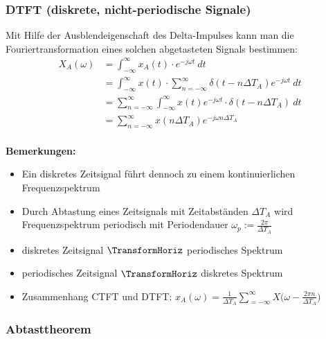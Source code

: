 \documentclass[12pt,a4paper]{scrartcl}
\begin{document}
\subsubsection{DTFT (diskrete, nicht-periodische Signale)}
  \label{sec.sub:sub:dtft}

  \noindent Mit Hilfe der Ausblendeigenschaft des Delta-Impulses kann man die Fouriertransformation eines solchen abgetasteten Signals bestimmen:
  \begin{equation}
    \label{eq:13}
    \begin{split}
      X_A(\omega) &=  \int_{-\infty}^{\infty} x_A(t) \cdot e^{-j \omega t}\ d t \\
      &=  \int_{-\infty}^{\infty} x(t) \cdot \sum_{n = -\infty}^{\infty} \delta (t-n\Delta T_A) e^{-j \omega t}\ d t\\
      &= \sum_{n = -\infty}^{\infty} \int_{-\infty}^{\infty} x(t) e^{-j\omega t} \cdot \delta(t-n\Delta T_A)\ dt\\
      &= \sum_{n=-\infty}^{\infty} x(n\Delta T_A) e^{-j\omega n \Delta T_A}
    \end{split}
  \end{equation} 
  \\
  \noindent  \textbf{Bemerkungen:}
  \begin{itemize}
    \item Ein diskretes Zeitsignal führt dennoch zu einem kontinuierlichen Frequenzspektrum
    \item Durch Abtastung eines Zeitsignals mit Zeitabständen $\Delta T_A$ wird Frequenzspektrum periodisch mit Periodendauer $\omega_p:= \frac{2\pi}{\Delta T_A}$
    \item diskretes Zeitsignal $\TransformHoriz$ periodisches Spektrum
    \item periodisches Zeitsignal $\TransformHoriz$ diskretes Spektrum
    \item Zusammenhang CTFT und DTFT: $x_A(\omega) = \frac{1}{\Delta T_A} \sum_{ =-\infty}^{\infty} X\Big(\omega - \frac{2\pi n}{\Delta T_A}\Big)$
  \end{itemize}

  \subsubsection{Abtasttheorem}
  \label{sec.sub:sub:abtasttheorem}
\end{document}
